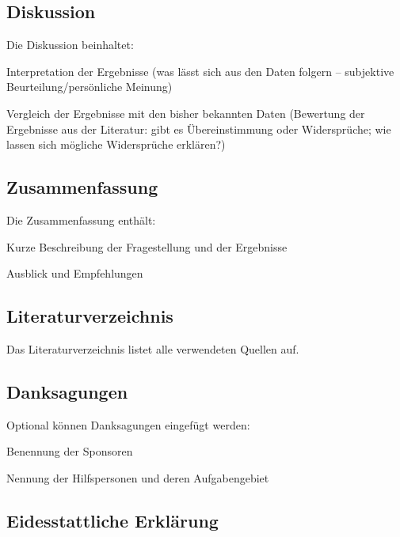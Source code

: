 \subsection{Diskussion}
\label{subsec:diskussion_struktur}

Die Diskussion beinhaltet:
\begin{listenabsatz}
	\item Interpretation der Ergebnisse (was lässt sich aus den Daten folgern -- subjektive Beurteilung/persönliche Meinung)
	\item Vergleich der Ergebnisse mit den bisher bekannten Daten (Bewertung der Ergebnisse aus der Literatur: gibt es Übereinstimmung oder Widersprüche; wie lassen sich mögliche Widersprüche erklären?)
\end{listenabsatz}

\subsection{Zusammenfassung}
\label{subsec:zusammenfassung_struktur}

Die Zusammenfassung enthält:
\begin{listenabsatz}
	\item Kurze Beschreibung der Fragestellung und der Ergebnisse
	\item Ausblick und Empfehlungen
\end{listenabsatz}

\subsection{Literaturverzeichnis}
\label{subsec:literatur_struktur}

Das Literaturverzeichnis listet alle verwendeten Quellen auf.

\subsection{Danksagungen}
\label{subsec:danksagungen_struktur}

Optional können Danksagungen eingefügt werden:
\begin{listenabsatz}
	\item Benennung der Sponsoren
	\item Nennung der Hilfspersonen und deren Aufgabengebiet
\end{listenabsatz}

\subsection{Eidesstattliche Erklärung}
\label{subsec:erklaerung_struktur}

